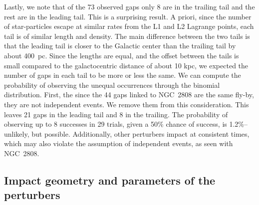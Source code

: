 \documentclass[draft]{aa}
\begin{document}
    Lastly, we note that of the 73 observed gaps only 8 are in the trailing tail and the rest are in the leading tail. This is a surprising result. A priori, since the number of star-particles escape at similar rates from the L1 and L2 Lagrange points, each tail is of similar length and density. The main difference between the two tails is that the leading tail is closer to the Galactic center than the trailing tail by about 400~pc. Since the lengths are equal, and the offset between the tails is small compared to the galactocentric distance of about 10 kpc, we expected the number of gaps in each tail to be more or less the same. We can compute the probability of observing the unequal occurrences through the binomial distribution. First, the since the 44 gaps linked to NGC~2808 are the same fly-by, they are not independent events. We remove them from this consideration. This leaves 21 gaps in the leading tail and 8 in the trailing. The probability of observing up to 8 successes in 29 trials, given a 50\% chance of success, is 1.2\%--unlikely, but possible. Additionally, other perturbers impact at consistent times, which may also violate the assumption of independent events, as seen with NGC~2808.


   
  \subsection{Impact geometry and parameters of the perturbers}\label{sect:geometry}
  
\end{document}
